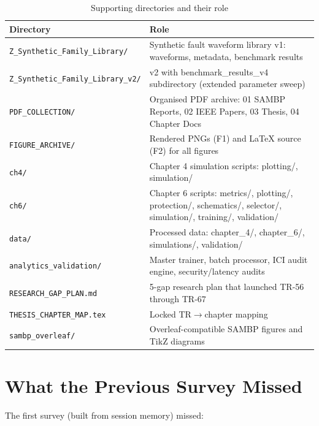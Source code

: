 \documentclass[11pt,a4paper]{article}
\begin{document}
\begin{table}[h!]
\centering
\caption{Supporting directories and their role}
\begin{tabularx}{\textwidth}{lX}
\toprule
\textbf{Directory} & \textbf{Role} \\
\midrule
\texttt{Z\_Synthetic\_Family\_Library/} & Synthetic fault waveform library v1: waveforms, metadata, benchmark results \\
\texttt{Z\_Synthetic\_Family\_Library\_v2/} & v2 with benchmark\_results\_v4 subdirectory (extended parameter sweep) \\
\texttt{PDF\_COLLECTION/} & Organised PDF archive: 01 SAMBP Reports, 02 IEEE Papers, 03 Thesis, 04 Chapter Docs \\
\texttt{FIGURE\_ARCHIVE/} & Rendered PNGs (F1) and LaTeX source (F2) for all figures \\
\texttt{ch4/} & Chapter 4 simulation scripts: plotting/, simulation/ \\
\texttt{ch6/} & Chapter 6 scripts: metrics/, plotting/, protection/, schematics/, selector/, simulation/, training/, validation/ \\
\texttt{data/} & Processed data: chapter\_4/, chapter\_6/, simulations/, validation/ \\
\texttt{analytics\_validation/} & Master trainer, batch processor, ICI audit engine, security/latency audits \\
\texttt{RESEARCH\_GAP\_PLAN.md} & 5-gap research plan that launched TR-56 through TR-67 \\
\texttt{THESIS\_CHAPTER\_MAP.tex} & Locked TR$\to$chapter mapping \\
\texttt{sambp\_overleaf/} & Overleaf-compatible SAMBP figures and TikZ diagrams \\
\bottomrule
\end{tabularx}
\end{table}

\newpage
\section{What the Previous Survey Missed}

The first survey (built from session memory) missed:
\end{document}
